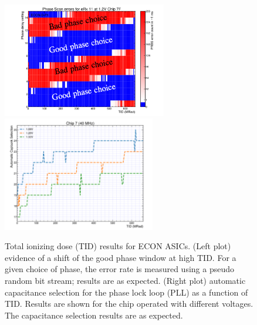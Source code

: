 \documentclass[twocolumn]{webofc}
\begin{document}
\begin{figure}[ht]
\centering
\includegraphics[height=5cm]{figures/econ-phaseTID.png}
\includegraphics[height=5cm]{figures/econ-capPLLTID.png}
\caption{Total ionizing dose (TID) results for ECON ASICs. (Left plot) evidence of a shift of the good phase window at high TID. For a given choice of phase, the error rate is measured using a pseudo random bit stream; results are as expected. (Right plot) automatic capacitance selection for the phase lock loop (PLL) as a function of TID. Results are shown for the chip operated with different voltages. The capacitance selection results are as expected.}
\label{fig:econ}
\vspace*{-0.6cm}
\end{figure}
\end{document}
